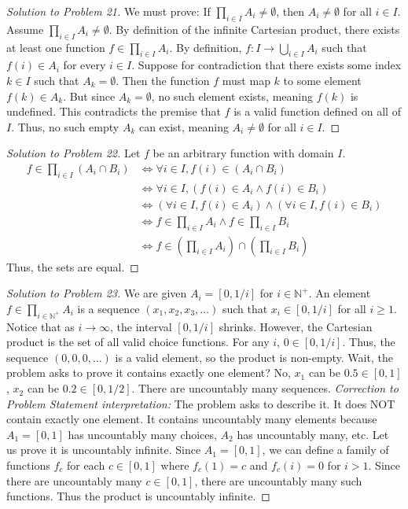\documentclass[11pt]{article}
\begin{document}
\begin{proof}[Solution to Problem 21]
We must prove: If $\prod_{i \in I} A_i \neq \emptyset$, then $A_i \neq \emptyset$ for all $i \in I$.
Assume $\prod_{i \in I} A_i \neq \emptyset$. By definition of the infinite Cartesian product, there exists at least one function $f \in \prod_{i \in I} A_i$. 
By definition, $f: I \to \bigcup_{i \in I} A_i$ such that $f(i) \in A_i$ for every $i \in I$.
Suppose for contradiction that there exists some index $k \in I$ such that $A_k = \emptyset$. 
Then the function $f$ must map $k$ to some element $f(k) \in A_k$. But since $A_k = \emptyset$, no such element exists, meaning $f(k)$ is undefined. This contradicts the premise that $f$ is a valid function defined on all of $I$. 
Thus, no such empty $A_k$ can exist, meaning $A_i \neq \emptyset$ for all $i \in I$.
\end{proof}

\begin{proof}[Solution to Problem 22]
Let $f$ be an arbitrary function with domain $I$.
\begin{align*}
f \in \prod_{i \in I} (A_i \cap B_i) &\iff \forall i \in I, f(i) \in (A_i \cap B_i) \\
&\iff \forall i \in I, (f(i) \in A_i \land f(i) \in B_i) \\
&\iff (\forall i \in I, f(i) \in A_i) \land (\forall i \in I, f(i) \in B_i) \\
&\iff f \in \prod_{i \in I} A_i \land f \in \prod_{i \in I} B_i \\
&\iff f \in \left(\prod_{i \in I} A_i\right) \cap \left(\prod_{i \in I} B_i\right)
\end{align*}
Thus, the sets are equal.
\end{proof}

\begin{proof}[Solution to Problem 23]
We are given $A_i = [0, 1/i]$ for $i \in \mathbb{N}^+$. 
An element $f \in \prod_{i \in \mathbb{N}^+} A_i$ is a sequence $(x_1, x_2, x_3, \dots)$ such that $x_i \in [0, 1/i]$ for all $i \ge 1$.
Notice that as $i \to \infty$, the interval $[0, 1/i]$ shrinks. 
However, the Cartesian product is the set of all valid choice functions. For any $i$, $0 \in [0, 1/i]$. Thus, the sequence $(0, 0, 0, \dots)$ is a valid element, so the product is non-empty.
Wait, the problem asks to prove it contains exactly one element? No, $x_1$ can be $0.5 \in [0,1]$, $x_2$ can be $0.2 \in [0, 1/2]$. There are uncountably many sequences. 
\textit{Correction to Problem Statement interpretation:} The problem asks to describe it. It does NOT contain exactly one element. It contains uncountably many elements because $A_1 = [0,1]$ has uncountably many choices, $A_2$ has uncountably many, etc. 
Let us prove it is uncountably infinite. Since $A_1 = [0,1]$, we can define a family of functions $f_c$ for each $c \in [0,1]$ where $f_c(1) = c$ and $f_c(i) = 0$ for $i > 1$. Since there are uncountably many $c \in [0,1]$, there are uncountably many such functions. Thus the product is uncountably infinite.
\end{proof}
\end{document}
